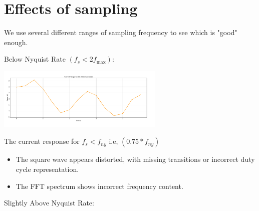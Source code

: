 \section{Effects of sampling}
We use several different ranges of sampling frequency to see which is "good" enough.
     \begin{center}
          Below Nyquist Rate $(f_s < 2 f_{\max})$: 
     \end{center}
    \captionsetup{type=figure}
    \centering
    \includegraphics[width=0.6\textwidth]{figs/0_75f_ny.png}
    \caption{The current response for  $f_s < f_{ny}$   i.e, $(0.75*f_{ny})$}
    \label{fig:example}
      \begin{itemize}
          \item The square wave appears distorted, with missing transitions or incorrect duty cycle representation.
          \item The FFT spectrum shows incorrect frequency content.
      \end{itemize}
    \begin{center}  
      Slightly Above Nyquist Rate: 
    \end{center}
      
